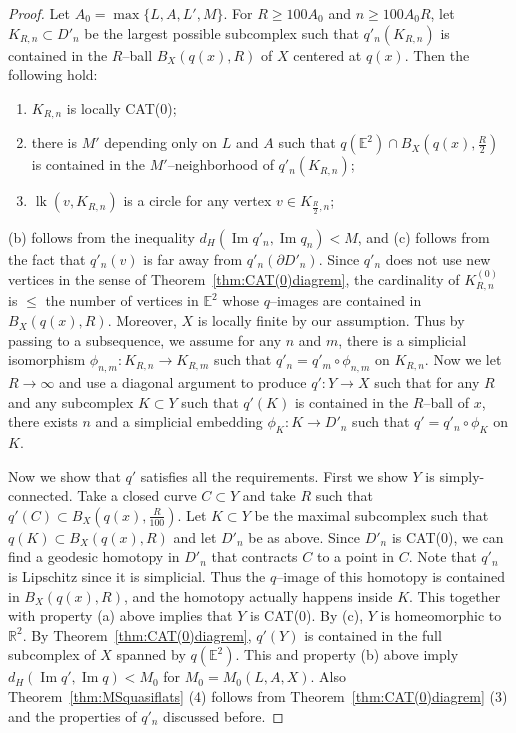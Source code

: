 \documentclass[11pt]{amsart}
\newcommand{\lk}{\operatorname{lk}}
\theoremstyle{definition}
\newcommand{\im}{\operatorname{Im}}
\begin{document}
\begin{proof}
Let $A_0=\max\{L,A,L',M\}$. For $R\ge 100 A_0$ and $n\ge 100A_0R$, let $K_{R,n}\subset D'_n$ be the largest possible subcomplex such that $q'_n(K_{R,n})$ is contained in the $R$--ball $B_X(q(x),R)$ of $X$ centered at $q(x)$. Then the following hold:
\begin{enumerate}[label=(\alph*)]
	\item $K_{R,n}$ is locally CAT(0);
	\item there is $M'$ depending only on $L$ and $A$ such that $q(\mathbb E^2)\cap B_X(q(x),\frac{R}{2})$ is contained in the $M'$--neighborhood of $q'_n(K_{R,n})$; 
	\item $\lk(v,K_{R,n})$ is a circle for any vertex $v\in K_{\frac{R}{2},n}$;
\end{enumerate}
(b) follows from the inequality $d_H(\im q'_n, \im q_n)<M$, and (c) follows from the fact that $q'_n(v)$ is far away from $q'_n(\partial D'_n)$. Since $q'_n$ does not use new vertices in the sense of Theorem~\ref{thm:CAT(0)diagrem}, the cardinality of $K^{(0)}_{R,n}$ is $\le$ the number of vertices in $\mathbb E^2$ whose $q$--images are contained in $B_X(q(x),R)$. Moreover, $X$ is locally finite by our assumption. Thus by passing to a subsequence, we assume for any $n$ and $m$, there is a simplicial isomorphism $\phi_{n,m}\colon K_{R,n}\to K_{R,m}$ such that $q'_n=q'_m\circ \phi_{n,m}$ on $K_{R,n}$. Now we let $R\to\infty$ and use a diagonal argument to produce $q'\colon Y\to X$ such that for any $R$ and any subcomplex $K\subset Y$ such that $q'(K)$ is contained in the $R$--ball of $x$, there exists $n$ and a simplicial embedding $\phi_K\colon K\to D'_n$ such that $q'=q'_n\circ \phi_K$ on $K$. 

Now we show that $q'$ satisfies all the requirements. First we show $Y$ is simply-connected. Take a closed curve $C\subset Y$ and take $R$ such that $q'(C)\subset B_{X}(q(x),\frac{R}{100})$. Let $K\subset Y$ be the maximal subcomplex such that $q(K)\subset B_X(q(x),R)$ and let $D'_n$ be as above. Since $D'_n$ is CAT(0), we can find a geodesic homotopy in $D'_n$ that contracts $C$ to a point in $C$. Note that $q'_n$ is Lipschitz since it is simplicial. Thus the $q$--image of this homotopy is contained in $B_X(q(x),R)$, and the homotopy actually happens inside $K$. This together with property (a) above implies that $Y$ is CAT(0). By (c), $Y$ is homeomorphic to $\mathbb R^2$. By Theorem~\ref{thm:CAT(0)diagrem}, $q'(Y)$ is contained in the full subcomplex of $X$ spanned by $q(\mathbb E^2)$. This and property (b) above imply $d_H(\im q', \im q)<M_0$ for $M_0=M_0(L,A,X)$. Also Theorem~\ref{thm:MSquasiflats} (4) follows from Theorem~\ref{thm:CAT(0)diagrem} (3) and the properties of $q'_n$ discussed before.


\end{proof}
\end{document}
